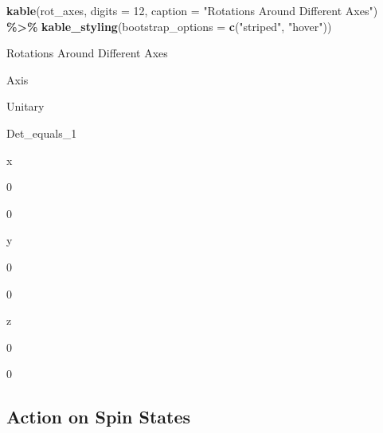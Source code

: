\documentclass[
]{book}
\newenvironment{Shaded}{\begin{snugshade}}{\end{snugshade}}
\newcommand{\AttributeTok}[1]{\textcolor[rgb]{0.13,0.29,0.53}{#1}}
\newcommand{\DecValTok}[1]{\textcolor[rgb]{0.00,0.00,0.81}{#1}}
\newcommand{\FunctionTok}[1]{\textcolor[rgb]{0.13,0.29,0.53}{\textbf{#1}}}
\newcommand{\NormalTok}[1]{#1}
\newcommand{\SpecialCharTok}[1]{\textcolor[rgb]{0.81,0.36,0.00}{\textbf{#1}}}
\newcommand{\StringTok}[1]{\textcolor[rgb]{0.31,0.60,0.02}{#1}}
\theoremstyle{definition}
\theoremstyle{definition}
\theoremstyle{definition}
\theoremstyle{definition}
\theoremstyle{remark}
\begin{document}
\begin{Shaded}
\begin{Highlighting}[]
\FunctionTok{kable}\NormalTok{(rot\_axes,}
      \AttributeTok{digits =} \DecValTok{12}\NormalTok{,}
      \AttributeTok{caption =} \StringTok{"Rotations Around Different Axes"}\NormalTok{) }\SpecialCharTok{\%\textgreater{}\%}
  \FunctionTok{kable\_styling}\NormalTok{(}\AttributeTok{bootstrap\_options =} \FunctionTok{c}\NormalTok{(}\StringTok{"striped"}\NormalTok{, }\StringTok{"hover"}\NormalTok{))}
\end{Highlighting}
\end{Shaded}

\label{tab:rotation-composition}Rotations Around Different Axes

Axis

Unitary

Det\_equals\_1

x

0

0

y

0

0

z

0

0

\subsection{Action on Spin States}\label{action-on-spin-states}
\end{document}
